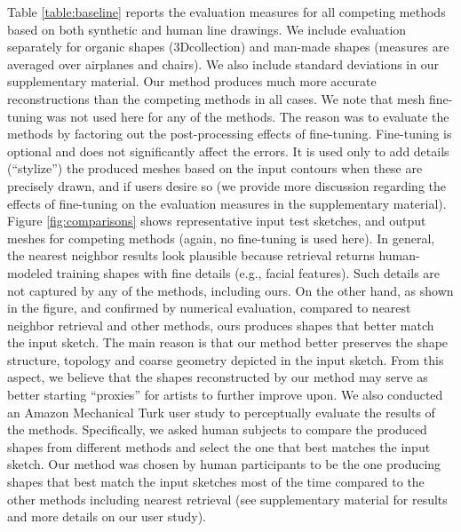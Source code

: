 \documentclass[10pt, conference, compsocconf]{IEEEtran}
\begin{document}
\vspace{-3mm}
Table  \ref{table:baseline} reports the evaluation measures for all competing methods based on both  synthetic and human  line drawings. We include evaluation separately for  organic shapes (3D\character collection) and man-made shapes (measures  are averaged over airplanes and chairs). We also include standard deviations in our supplementary material. Our method produces much more accurate reconstructions than the competing methods in all cases. We note that  mesh fine-tuning was  not used here for any of the methods.
The reason was to evaluate the  methods by factoring out the post-processing effects of fine-tuning.
Fine-tuning is optional and does not significantly affect  the errors. It is used only to add details (``stylize'') the produced meshes based on the input contours when these are precisely drawn, and if users desire so (we provide more discussion regarding the effects of fine-tuning on the evaluation measures in the supplementary material). 
Figure \ref{fig:comparisons} shows representative input test sketches, and output meshes for  competing methods (again, no fine-tuning is used here). 
In general, the nearest neighbor results  look plausible because retrieval returns human-modeled training shapes with fine details (e.g., facial features). Such details are not captured by any of the methods, including ours. 
On the other hand, as shown in the figure, and  confirmed by numerical evaluation, compared to nearest neighbor retrieval and other methods, ours produces shapes that better match the input sketch. The main reason is that our method better preserves the shape structure, topology and coarse geometry depicted in the input sketch.
From this aspect, we believe that the  shapes reconstructed by our method may serve as better starting ``proxies'' for artists to further improve upon. We also conducted an Amazon Mechanical Turk user study to perceptually evaluate the results of the methods. Specifically,
 we asked human subjects to compare the produced shapes from  different methods and select the one that best matches the input sketch. Our method was chosen by human participants to be the one producing shapes that best match the input sketches most of the time compared to the other methods including nearest retrieval (see supplementary material for results and more details on our user study).
\end{document}

